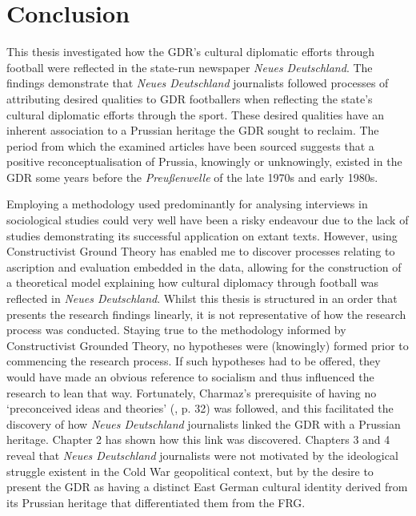 \chapter{Conclusion\label{cha:conclusion}}

This thesis investigated how the GDR’s cultural diplomatic efforts through football were reflected in the state-run newspaper \textit{Neues Deutschland}. The findings demonstrate that \textit{Neues Deutschland} journalists followed processes of attributing desired qualities to GDR footballers when reflecting the state’s cultural diplomatic efforts through the sport. These desired qualities have an inherent association to a Prussian heritage the GDR sought to reclaim. The period from which the examined articles have been sourced suggests that a positive reconceptualisation of Prussia, knowingly or unknowingly, existed in the GDR some years before the \textit{Preußenwelle} of the late 1970s and early 1980s.

Employing a methodology used predominantly for analysing interviews in sociological studies could very well have been a risky endeavour due to the lack of studies demonstrating its successful application on extant texts. However, using Constructivist Ground Theory has enabled me to discover processes relating to ascription and evaluation embedded in the data, allowing for the construction of a theoretical model explaining how cultural diplomacy through football was reflected in \textit{Neues Deutschland}. Whilst this thesis is structured in an order that presents the research findings linearly, it is not representative of how the research process was conducted. Staying true to the methodology informed by Constructivist Grounded Theory, no hypotheses were (knowingly) formed prior to commencing the research process. If such hypotheses had to be offered, they would have made an obvious reference to socialism and thus influenced the research to lean that way. Fortunately, Charmaz’s prerequisite of having no ‘preconceived ideas and theories’ (\cite{charmaz2014}, p. 32) was followed, and this facilitated the discovery of how \textit{Neues Deutschland} journalists linked the GDR with a Prussian heritage. Chapter 2 has shown how this link was discovered. Chapters 3 and 4 reveal that \textit{Neues Deutschland} journalists were not motivated by the ideological struggle existent in the Cold War geopolitical context, but by the desire to present the GDR as having a distinct East German cultural identity derived from its Prussian heritage that differentiated them from the FRG.

